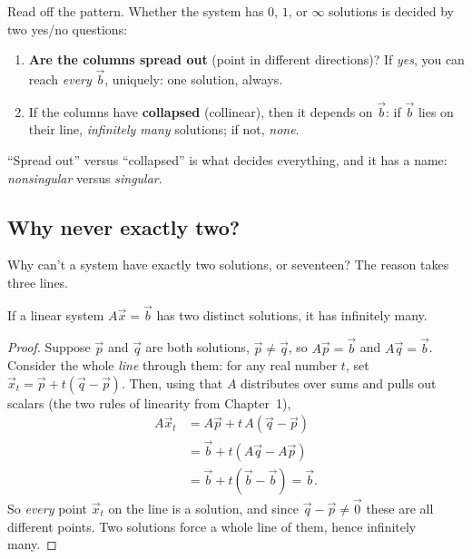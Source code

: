 \begin{focusbox}
Read off the pattern. Whether the system has $0$, $1$, or $\infty$ solutions
is decided by two yes/no questions:
\begin{enumerate}
  \item \textbf{Are the columns spread out} (point in different
  directions)? If \emph{yes}, you can reach \emph{every} $\vec b$, uniquely:
  one solution, always.
  \item If the columns have \textbf{collapsed} (collinear), then it depends
  on $\vec b$: if $\vec b$ lies on their line, \emph{infinitely many}
  solutions; if not, \emph{none}.
\end{enumerate}
``Spread out'' versus ``collapsed'' is what decides everything, and it has
a name: \emph{nonsingular} versus \emph{singular}.
\end{focusbox}

\subsection{Why never exactly two?}

Why can't a system have exactly two solutions, or seventeen? The reason
takes three lines.

\begin{proposition}
\label{ch06:zoi}
If a linear system $A\vec x=\vec b$ has two distinct solutions, it has
infinitely many.
\end{proposition}

\begin{proof}
Suppose $\vec p$ and $\vec q$ are both solutions, $\vec p\neq\vec q$, so
$A\vec p=\vec b$ and $A\vec q=\vec b$. Consider the whole \emph{line}
through them: for any real number $t$, set
$\vec x_t=\vec p + t(\vec q-\vec p)$. Then, using that $A$ distributes over
sums and pulls out scalars (the two rules of linearity from Chapter~1),
\[
\begin{aligned}
  A\vec x_t &= A\vec p + t\,A(\vec q-\vec p)\\
            &= \vec b + t(A\vec q - A\vec p)\\
            &= \vec b + t(\vec b-\vec b) = \vec b.
\end{aligned}
\]
So \emph{every} point $\vec x_t$ on the line is a solution, and since
$\vec q-\vec p\neq\vec 0$ these are all different points. Two solutions
force a whole line of them, hence infinitely many.
\end{proof}

